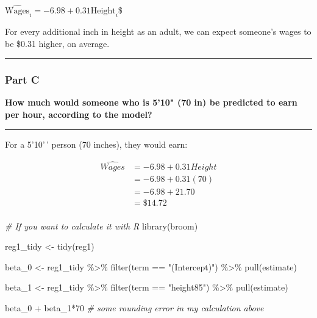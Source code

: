 \documentclass[
]{article}
\newenvironment{Shaded}{\begin{snugshade}}{\end{snugshade}}
\newcommand{\CommentTok}[1]{\textcolor[rgb]{0.56,0.35,0.01}{\textit{#1}}}
\newcommand{\DecValTok}[1]{\textcolor[rgb]{0.00,0.00,0.81}{#1}}
\newcommand{\FunctionTok}[1]{\textcolor[rgb]{0.00,0.00,0.00}{#1}}
\newcommand{\NormalTok}[1]{#1}
\newcommand{\OtherTok}[1]{\textcolor[rgb]{0.56,0.35,0.01}{#1}}
\newcommand{\SpecialCharTok}[1]{\textcolor[rgb]{0.00,0.00,0.00}{#1}}
\newcommand{\StringTok}[1]{\textcolor[rgb]{0.31,0.60,0.02}{#1}}
\begin{document}
\(\widehat{\text{Wages}_i} = -6.98+0.31\text{Height}_i\)\$

For every additional inch in height as an adult, we can expect someone's
wages to be \$0.31 higher, on average.

\begin{center}\rule{0.5\linewidth}{0.5pt}\end{center}

\hypertarget{part-c-3}{%
\subsubsection{Part C}\label{part-c-3}}

\textbf{How much would someone who is 5'10" (70 in) be predicted to earn
per hour, according to the model?}

\begin{center}\rule{0.5\linewidth}{0.5pt}\end{center}

For a 5'10'\,' person (70 inches), they would earn:

\[\begin{align*}
    \widehat{Wages}&=-6.98+0.31Height\\
    &=-6.98+0.31(70)\\
    &=-6.98+21.70\\
    &=\$14.72\\ 
\end{align*}\]

\begin{Shaded}
\begin{Highlighting}[]
\CommentTok{\# If you want to calculate it with R}
\FunctionTok{library}\NormalTok{(broom)}

\NormalTok{reg1\_tidy }\OtherTok{\textless{}{-}} \FunctionTok{tidy}\NormalTok{(reg1)}

\NormalTok{beta\_0 }\OtherTok{\textless{}{-}}\NormalTok{ reg1\_tidy }\SpecialCharTok{\%\textgreater{}\%}
  \FunctionTok{filter}\NormalTok{(term }\SpecialCharTok{==} \StringTok{"(Intercept)"}\NormalTok{) }\SpecialCharTok{\%\textgreater{}\%}
  \FunctionTok{pull}\NormalTok{(estimate)}

\NormalTok{beta\_1 }\OtherTok{\textless{}{-}}\NormalTok{ reg1\_tidy }\SpecialCharTok{\%\textgreater{}\%}
  \FunctionTok{filter}\NormalTok{(term }\SpecialCharTok{==} \StringTok{"height85"}\NormalTok{) }\SpecialCharTok{\%\textgreater{}\%}
  \FunctionTok{pull}\NormalTok{(estimate)}

\NormalTok{beta\_0 }\SpecialCharTok{+}\NormalTok{ beta\_1}\SpecialCharTok{*}\DecValTok{70} \CommentTok{\# some rounding error in my calculation above}
\end{Highlighting}
\end{Shaded}
\end{document}
